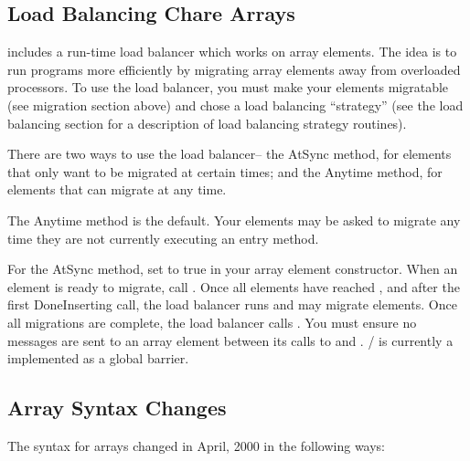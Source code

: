 \subsection{Load Balancing Chare Arrays}
\charmpp{} includes a run-time load balancer which works
on array elements.  The idea is to run programs more efficiently
by migrating array elements away from overloaded processors.
To use the load balancer, you must make your elements migratable
(see migration section above) and chose a load balancing 
``strategy'' (see the load balancing section for a description
of load balancing strategy routines).

There are two ways to use the load balancer-- the AtSync
method, for elements that only want to be migrated at certain
times; and the Anytime method, for elements that can migrate
at any time.

The Anytime method is the default.  Your elements may be
asked to migrate any time they are not currently executing
an entry method.

For the AtSync method, set  to true in your 
array element constructor.  When an element is ready to migrate,
call .  Once all elements have reached , 
and after the first DoneInserting call,
the load balancer runs and may migrate elements.  Once
all migrations are complete, the load balancer calls 
.  You must ensure no messages are
sent to an array element between its calls to  and
. / is currently
a implemented as a global barrier.


\subsection{Array Syntax Changes}

The syntax for arrays changed in April, 2000 in the following ways:

